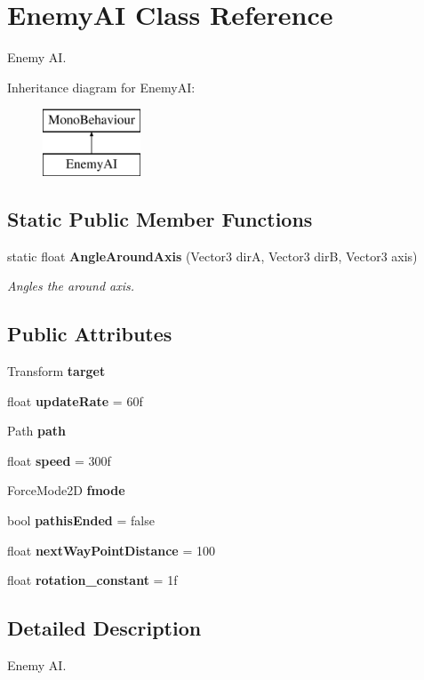 \section{Enemy\+AI Class Reference}
\label{class_enemy_a_i}


Enemy AI.  


Inheritance diagram for Enemy\+AI\+:\begin{figure}[H]
\begin{center}
\leavevmode
\includegraphics[height=2.000000cm]{class_enemy_a_i}
\end{center}
\end{figure}
\subsection*{Static Public Member Functions}
\begin{DoxyCompactItemize}
\item 
static float {\bf Angle\+Around\+Axis} (Vector3 dirA, Vector3 dirB, Vector3 axis)
\begin{DoxyCompactList}\small\item\em Angles the around axis. \end{DoxyCompactList}\end{DoxyCompactItemize}
\subsection*{Public Attributes}
\begin{DoxyCompactItemize}
\item 
Transform {\bf target}
\item 
float {\bf update\+Rate} = 60f
\item 
Path {\bf path}
\item 
float {\bf speed} = 300f
\item 
Force\+Mode2D {\bf fmode}
\item 
bool {\bf pathis\+Ended} = false
\item 
float {\bf next\+Way\+Point\+Distance} = 100
\item 
float {\bf rotation\+\_\+constant} = 1f
\end{DoxyCompactItemize}


\subsection{Detailed Description}
Enemy AI. 



